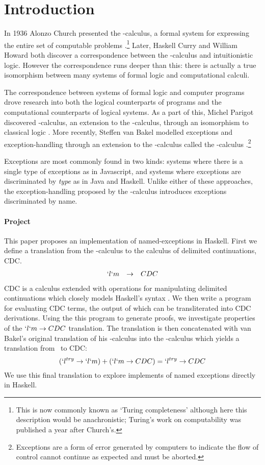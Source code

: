 \chapter{Introduction}

In 1936 Alonzo Church presented the \lam-calculus, a formal system for expressing the entire set of computable problems \cite{Church36}.\footnote{
  This is now commonly known as `Turing completeness' although here
  this description would be anachronistic; Turing's work on computability was published a year after Church's.
}
Later, Haskell Curry and William Howard both discover a correspondence between the \lam-calculus and intuitionistic logic. 
However the correspondence runs deeper than this: there is actually a true isomorphism between many systems of formal logic and computational calculi. 

The correspondence between systems of formal logic and computer programs drove research into both the logical counterparts of programs and the computational counterparts of logical systems.
As a part of this, Michel Parigot discovered \lmu-calculus, an extension to the \lam-calculus, 
through an isomorphism to classical logic \cite{Parigot92}.
More recently, Steffen van Bakel modelled exceptions and exception-handling through an extension to the \lam-calculus called the \ltry-calculus \cite{Bakel15}.\footnote{
  Exceptions are a form of error generated by computers to indicate the flow of control cannot continue as expected and must be aborted. 
}

Exceptions are most commonly found in two kinds: 
  systems where there is a single type of exceptions as in Javascript, 
  and systems where exceptions are discriminated by \emph{type} as in Java and Haskell. 
Unlike either of these approaches, 
the exception-handling proposed by the \ltry-calculus introduces exceptions discriminated by name.

\subsubsection{Project}
This paper proposes an implementation of named-exceptions in Haskell.
First we define a translation from the \lmu-calculus to the calculus of delimited continuations, CDC.
\[
\begin{array}{lcr}
  `l`m & \to & CDC
\end{array}
\]
CDC is a calculus extended with operations for manipulating delimited continuations which closely models Haskell's syntax \cite{JonesDS07}. 
We then write a program for evaluating CDC terms, the output of which can be transliterated into CDC derivations.
Using the this program to generate proofs, we investigate properties of the $`l`m \to CDC$ translation.
The translation is then concatenated with van Bakel's original translation of his \ltry-calculus into the \lmu-calculus which yields a translation from \ltry\ to CDC:
\[
   (`l^{try} \to `l`m) + (`l`m \to CDC) = `l^{try} \to CDC
\]
We use this final translation to explore implements of named exceptions directly in Haskell.

